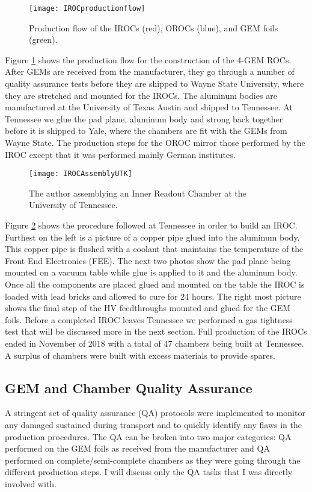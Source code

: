 \begin{figure}[h]
\texttt{[image: IROCproductionflow]}
\centering
\caption{Production flow of the IROCs (red), OROCs (blue), and GEM foils (green)\cite{Dick2017QM}. }
\label{fig:IROCprod}
\end{figure}

\noindent
Figure \ref{fig:IROCprod} shows the production flow for the construction of the 4-GEM ROCs.  After GEMs are received from the manufacturer, they go through a number of quality assurance tests before they are shipped to Wayne State University, where they are stretched and mounted for the IROCs.   The aluminum bodies are manufactured at the University of Texas Austin and shipped to Tennessee.  At Tennessee we glue the pad plane, aluminum body and strong back together before it is shipped to Yale, where the chambers are fit with the GEMs from Wayne State.  The production steps for the OROC mirror those performed by the IROC except that it was performed mainly German institutes.

\begin{figure}[h!]
\texttt{[image: IROCAssemblyUTK]}
\centering
\caption{The author assemblying an Inner Readout Chamber at the University of Tennessee. }
\label{fig:IROCassm}
\end{figure}

Figure \ref{fig:IROCassm} shows the procedure followed at Tennessee in order to build an IROC.  Furthest on the left is a picture of a copper pipe glued into the aluminum body.  This copper pipe is flushed with a coolant that maintains the temperature of the Front End Electronics (FEE).  The next two photos show the pad plane being mounted on a vacuum table while glue is applied to it and the aluminum body.  Once all the components are placed glued and mounted on the table the IROC is loaded with lead bricks and allowed to cure for 24 hours.  The right most picture shows the final step of the HV feedthroughs mounted and glued for the GEM foils.  Before a completed IROC leaves Tennessee we performed a gas tightness test that will be discussed more in the next section.  Full production of the IROCs ended in November of 2018 with a total of 47 chambers being built at Tennessee.  A surplus of chambers were built with excess materials to provide spares.


\subsection{GEM and Chamber Quality Assurance}
A stringent set of quality assurance (QA)\cite{Brucken:2018rej}\cite{Brucken:2017qjy} protocols were implemented to monitor any damaged sustained during transport and to quickly identify any flaws in the production procedures.  The QA can be broken into two major categories: QA performed on the GEM foils as received from the manufacturer and QA performed on complete/semi-complete chambers as they were going through the different production steps.  I will discuss only the QA tasks that I was directly involved with.

